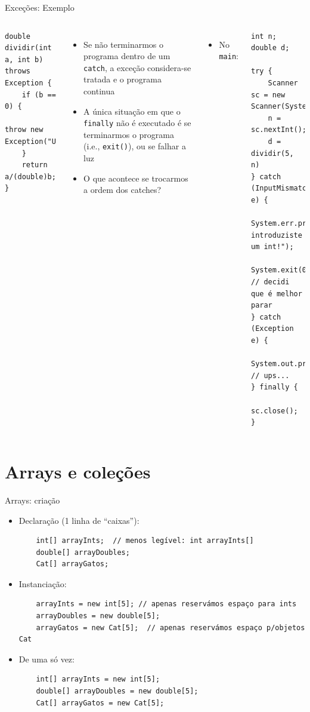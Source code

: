 \documentclass[portuguese, aspectratio=169, xcolor=table]{beamer}
\begin{document}
\begin{frame}[fragile]{Exceções: Exemplo}
\scriptsize
\begin{columns}
\begin{verbatim}
double dividir(int a, int b) throws Exception {
    if (b == 0) {
        throw new Exception("Ups...");
    }
    return a/(double)b;
}
\end{verbatim}
\begin{itemize}

\item Se não terminarmos o programa dentro de um \texttt{catch}, a exceção considera-se tratada e o programa continua
\item A única situação em que o \texttt{finally} não é executado é se terminarmos o programa (i.e., \texttt{exit()}), ou se falhar a luz
\item O que acontece se trocarmos a ordem dos catches?
\end{itemize}
\begin{itemize}
\item No \texttt{main}:
\end{itemize}
\begin{verbatim}
int n;
double d;

try {
    Scanner sc = new Scanner(System.in);
    n = sc.nextInt();
    d = dividir(5, n)
} catch (InputMismatchException e) {
    System.err.print("Não introduziste um int!");
    System.exit(0);  // decidi que é melhor parar
} catch (Exception e) {
    System.out.println(e.getMessage()); // ups...
} finally {
    sc.close();
}
\end{verbatim}
\end{columns}
\end{frame}

\section{Arrays e coleções}

\begin{frame}[fragile]{Arrays: criação}
\begin{itemize}
\item Declaração (1 linha de ``caixas''):
\begin{verbatim}
    int[] arrayInts;  // menos legível: int arrayInts[]
    double[] arrayDoubles;
    Cat[] arrayGatos;
\end{verbatim}
\item Instanciação:
\begin{verbatim}
    arrayInts = new int[5]; // apenas reservámos espaço para ints
    arrayDoubles = new double[5];
    arrayGatos = new Cat[5];  // apenas reservámos espaço p/objetos Cat
\end{verbatim}
\item De uma só vez:
\begin{verbatim}
    int[] arrayInts = new int[5];
    double[] arrayDoubles = new double[5];
    Cat[] arrayGatos = new Cat[5];
\end{verbatim}
\end{itemize}
\end{frame}
\end{document}
